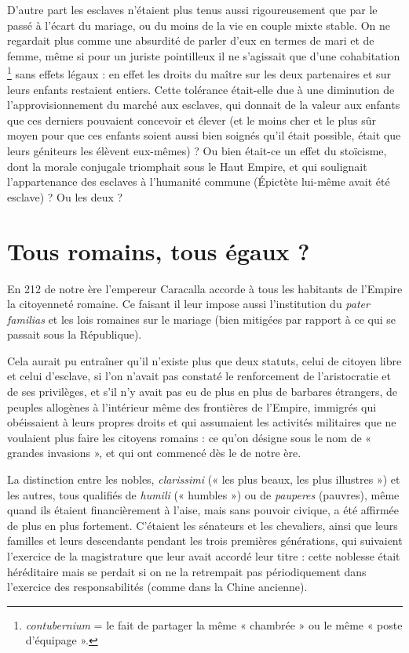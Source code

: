  D'autre part les esclaves n'étaient plus tenus aussi rigoureusement que par le passé à l'écart du mariage, ou du moins de la vie en couple mixte stable. On ne regardait plus comme une absurdité de parler d'eux en termes de mari et de femme, même si pour un juriste pointilleux il ne s'agissait que d'une cohabitation%
\footnote{\emph{contubernium} = le fait de partager la même « chambrée » ou le même « poste d'équipage ».}
sans effets légaux : en effet les droits du maître sur les deux partenaires et sur leurs enfants restaient entiers. Cette tolérance était-elle due à une diminution de l'approvisionnement du marché aux esclaves, qui donnait de la valeur aux enfants que ces derniers pouvaient concevoir et élever (et le moins cher et le plus sûr moyen pour que ces enfants soient aussi bien soignés qu'il était possible, était que leurs géniteurs les élèvent eux-mêmes) ? Ou bien était-ce un effet du stoïcisme, dont la morale conjugale triomphait sous le Haut Empire, et qui soulignait l'appartenance des esclaves à l'humanité commune ({Épictète} lui-même avait été esclave) ? Ou les deux ? 
 
 
\section{Tous romains, tous égaux ?}

 En 212 de notre ère l'empereur Caracalla accorde à tous les habitants de l'Empire la citoyenneté romaine. Ce faisant il leur impose aussi l'institution du \emph{pater familias} et les lois romaines sur le mariage (bien mitigées par rapport à ce qui se passait sous la République). 

 Cela aurait pu entraîner qu'il n'existe plus que deux statuts, celui de citoyen libre et celui d'esclave, si l'on n'avait pas constaté le renforcement de l'aristocratie et de ses privilèges, et s'il n'y avait pas eu de plus en plus de barbares étrangers, de peuples allogènes à l'intérieur même des frontières de l'Empire, immigrés qui obéissaient à leurs propres droits et qui assumaient les activités militaires que ne voulaient plus faire les citoyens romains : ce qu'on désigne sous le nom de « grandes invasions », et qui ont commencé dès le  de notre ère. 

 La distinction entre les nobles, {\emph{clarissimi}} (« les plus beaux, les plus illustres ») et les autres, tous qualifiés de {\emph{humili}} (« humbles ») ou de {\emph{pauperes}} (pauvres), même quand ils étaient financièrement à l'aise, mais sans pouvoir civique, a été affirmée de plus en plus fortement. C'étaient les sénateurs et les chevaliers, ainsi que leurs familles et leurs descendants pendant les trois premières générations, qui suivaient l'exercice de la magistrature que leur avait accordé leur titre : cette noblesse était héréditaire mais se perdait si on ne la retrempait pas périodiquement dans l'exercice des responsabilités (comme dans la Chine ancienne).

